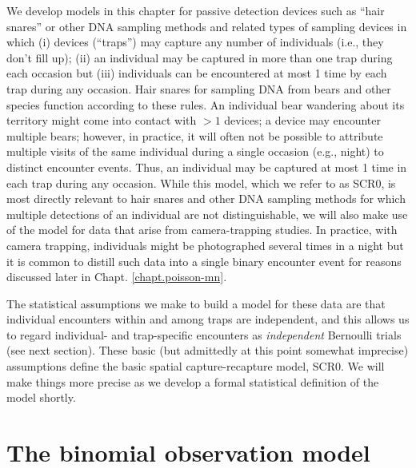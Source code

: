 We develop models in this chapter for passive detection devices such
as ``hair snares'' or other DNA sampling methods
\citep{kery_etal:2010, gardner_etal:2010jwm} and related types of
sampling devices in which (i) devices (``traps'') may
capture any number of individuals (i.e., they don't fill up); (ii) an
individual may be captured in more than one trap during each occasion
but (iii) individuals can be encountered at most 1 time by each trap
during any occasion.  Hair snares for sampling DNA from bears and
other species function according to these rules. An individual bear
wandering about its territory might come into contact with $>1$
devices; a device may encounter multiple bears; however, in practice,
it will often not be possible to attribute multiple visits of the same
individual during a single occasion (e.g., night) to distinct
encounter events. Thus, an individual may be captured at most 1 time
in each trap during any occasion.  While this model, which we refer to
as SCR0, is most
directly relevant to hair snares and other DNA sampling methods for
which multiple detections of an individual are not distinguishable, we
will also make use of the model for data that arise from
camera-trapping studies. In practice, with camera trapping,
individuals might be photographed several times in a night but it is
common to distill such data into a single binary encounter event for
reasons discussed later in Chapt. \ref{chapt.poisson-mn}.

The statistical assumptions we make to build a model for these data
are that individual encounters within and among traps are independent,
and this allows us to regard individual- and trap-specific encounters
as {\it independent} Bernoulli trials (see next section).  These basic
(but admittedly at this point somewhat imprecise) assumptions define
the basic spatial capture-recapture model, SCR0.
We will make things more precise as
we develop a formal statistical definition of the model shortly.


\section{The binomial observation model}
\label{scr0.sec.binomial}

